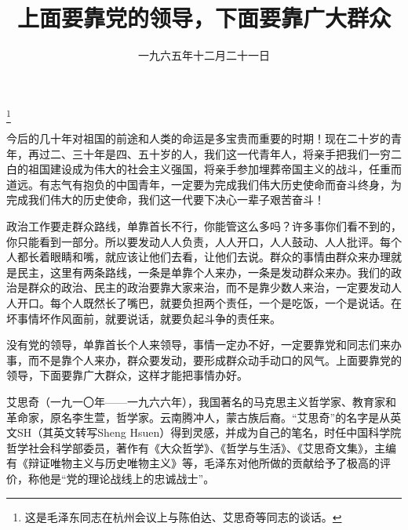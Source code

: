
\title{上面要靠党的领导，下面要靠广大群众}
\date{一九六五年十二月二十一日}
\thanks{这是毛泽东同志在杭州会议上与陈伯达、艾思奇等同志的谈话。}
\maketitle


今后的几十年对祖国的前途和人类的命运是多宝贵而重要的时期！现在二十岁的青年，再过二、三十年是四、五十岁的人，我们这一代青年人，将亲手把我们一穷二白的祖国建设成为伟大的社会主义强国，将亲手参加埋葬帝国主义的战斗，任重而道远。有志气有抱负的中国青年，一定要为完成我们伟大历史使命而奋斗终身，为完成我们伟大的历史使命，我们这一代要下决心一辈子艰苦奋斗！

政治工作要走群众路线，单靠首长不行，你能管这么多吗？许多事你们看不到的，你只能看到一部分。所以要发动人人负责，人人开口，人人鼓动、人人批评。每个人都长着眼睛和嘴，就应该让他们去看，让他们去说。群众的事情由群众来办理就是民主，这里有两条路线，一条是单靠个人来办，一条是发动群众来办。我们的政治是群众的政治、民主的政治要靠大家来治，而不是靠少数人来治，一定要发动人人开口。每个人既然长了嘴巴，就要负担两个责任，一个是吃饭，一个是说话。在坏事情坏作风面前，就要说话，就要负起斗争的责任来。

没有党的领导，单靠首长个人来领导，事情一定办不好，一定要靠党和同志们来办事，而不是靠个人来办，群众要发动，要形成群众动手动口的风气。上面要靠党的领导，下面要靠广大群众，这样才能把事情办好。

\begin{maonote}
艾思奇（一九一〇年——一九六六年），我国著名的马克思主义哲学家、教育家和革命家，原名李生萱，哲学家。云南腾冲人，蒙古族后裔。“艾思奇”的名字是从英文SH（其英文转写Sheng Hsuen）得到灵感，并成为自己的笔名，时任中国科学院哲学社会科学部委员，著作有《大众哲学》、《哲学与生活》、《艾思奇文集》，主编有《辩证唯物主义与历史唯物主义》等，毛泽东对他所做的贡献给予了极高的评价，称他是“党的理论战线上的忠诚战士”。
\end{maonote}

